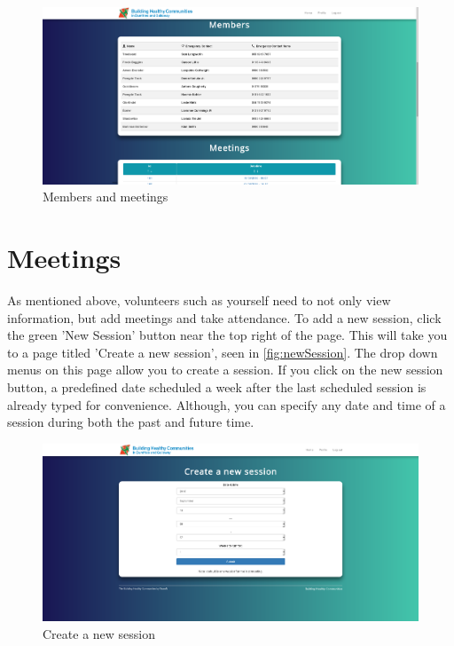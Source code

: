 \documentclass{bhcguides}
\begin{document}
\begin{figure}[h]
 \centerline{\includegraphics[width=\textwidth, height=\textheight, keepaspectratio]{membersandmeetings.png}}
 \caption{Members and meetings}
 \label{fig:memsandmeets}
\end{figure}

\pagebreak

\section{Meetings}
\label{sec:meetings}

As mentioned above, volunteers such as yourself need to not only view information, but add meetings and take attendance. To add a new session, click the green 'New Session' button near the top right of the page. This will take you to a page titled 'Create a new session', seen in \autoref{fig:newSession}. The drop down menus on this page allow you to create a session. If you click on the new session button, a predefined date scheduled a week after the last scheduled session is already typed for convenience. Although, you can specify any date and time of a session during both the past and future time.

\begin{figure}[h]
 \centerline{\includegraphics[width=\textwidth, height=\textheight, keepaspectratio]{newsession.png}}
 \caption{Create a new session}
 \label{fig:newSession}
\end{figure}
\end{document}
